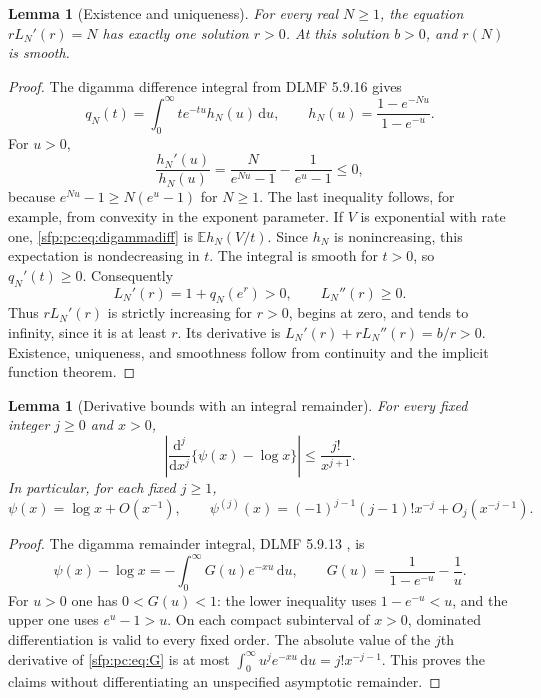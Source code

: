 \documentclass[11pt,letterpaper]{article}
\numberwithin{equation}{section}
\newtheorem{lemma}[theorem]{Lemma}
\theoremstyle{definition}\newtheorem{definition}[theorem]{Definition}
\theoremstyle{remark}\newtheorem{remark}[theorem]{Remark}
\newcommand{\EE}{\mathbb E}
\newcommand{\dd}{\,\mathrm d}
\begin{document}
\begin{lemma}[Existence and uniqueness]\label{sfp:pc:lem:exist}
For every real $N\geq1$, the equation $rL_N'(r)=N$ has exactly
one solution $r>0$. At this solution $b>0$, and $r(N)$ is smooth.
\end{lemma}
\begin{proof}
The digamma difference integral from DLMF 5.9.16 \cite{dlmf} gives
\begin{equation}\label{sfp:pc:eq:digammadiff}
 q_N(t)=\int_0^\infty te^{-tu}h_N(u)\dd u,
 \qquad h_N(u)=\frac{1-e^{-Nu}}{1-e^{-u}}.
\end{equation}
For $u>0$,
\[
 \frac{h_N'(u)}{h_N(u)}
 =\frac{N}{e^{Nu}-1}-\frac1{e^u-1}\leq0,
\]
because $e^{Nu}-1\geq N(e^u-1)$ for $N\geq1$.
The last inequality follows, for example, from convexity in the
exponent parameter. If $V$ is exponential with rate one,
\eqref{sfp:pc:eq:digammadiff} is $\EE h_N(V/t)$. Since $h_N$ is
nonincreasing, this expectation is nondecreasing in $t$.
The integral is smooth for $t>0$, so $q_N'(t)\geq0$.
Consequently
\[
 L_N'(r)=1+q_N(e^r)>0,\qquad L_N''(r)\geq0.
\]
Thus $rL_N'(r)$ is strictly increasing for $r>0$, begins at zero,
and tends to infinity, since it is at least $r$. Its derivative is
$L_N'(r)+rL_N''(r)=b/r>0$. Existence, uniqueness, and smoothness
follow from continuity and the implicit function theorem.
\end{proof}

\begin{lemma}[Derivative bounds with an integral remainder]\label{sfp:pc:lem:psi}
For every fixed integer $j\geq0$ and $x>0$,
\begin{equation}\label{sfp:pc:eq:psiremainder}
 \left|\frac{\mathrm d^j}{\mathrm dx^j}
          \{\psi(x)-\log x\}\right|
       \leq \frac{j!}{x^{j+1}}.
\end{equation}
In particular, for each fixed $j\geq1$,
\begin{equation}\label{sfp:pc:eq:polygamma}
 \psi(x)=\log x+O(x^{-1}),\qquad
 \psi^{(j)}(x)=(-1)^{j-1}(j-1)!x^{-j}+O_j(x^{-j-1}).
\end{equation}
\end{lemma}
\begin{proof}
The digamma remainder integral, DLMF 5.9.13 \cite{dlmf}, is
\begin{equation}\label{sfp:pc:eq:G}
 \psi(x)-\log x=-\int_0^\infty G(u)e^{-xu}\dd u,
 \qquad G(u)=\frac1{1-e^{-u}}-\frac1u.
\end{equation}
For $u>0$ one has $0<G(u)<1$: the lower inequality uses
$1-e^{-u}<u$, and the upper one uses $e^u-1>u$.
On each compact subinterval of $x>0$, dominated differentiation is
valid to every fixed order. The absolute value of the $j$th
derivative of \eqref{sfp:pc:eq:G} is at most
$\int_0^\infty u^je^{-xu}\dd u=j!x^{-j-1}$.
This proves the claims without differentiating an unspecified
asymptotic remainder.
\end{proof}
\end{document}
